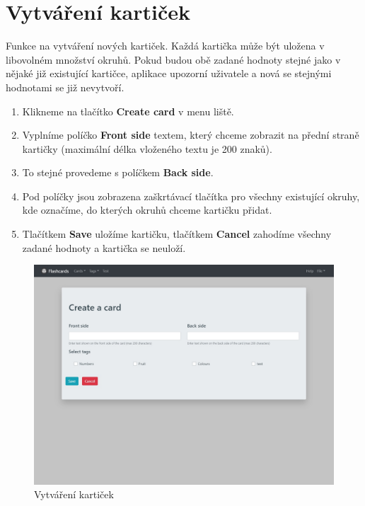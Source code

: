 \documentclass[11pt]{article}
\providecommand{\tightlist}{\setlength{\itemsep}{1pt}\setlength{\parskip}{1pt}}
\begin{document}
\hypertarget{vytvuxe1ux159enuxed-kartiux10dek}{%
\section{Vytváření kartiček}\label{vytvuxe1ux159enuxed-kartiux10dek}}

Funkce na vytváření nových kartiček. Každá kartička může být uložena v
libovolném množství okruhů. Pokud budou obě zadané hodnoty stejné jako v
nějaké již existující kartičce, aplikace upozorní uživatele a nová se
stejnými hodnotami se již nevytvoří.

\begin{enumerate}
\def\labelenumi{\arabic{enumi}.}
\tightlist
\item
  Klikneme na tlačítko \textbf{Create card} v menu liště.
\item
  Vyplníme políčko \textbf{Front side} textem, který chceme zobrazit na
  přední straně kartičky (maximální délka vloženého textu je 200 znaků).
\item
  To stejné provedeme s políčkem \textbf{Back side}.
\item
  Pod políčky jsou zobrazena zaškrtávací tlačítka pro všechny existující
  okruhy, kde označíme, do kterých okruhů chceme kartičku přidat.
\item
  Tlačítkem \textbf{Save} uložíme kartičku, tlačítkem \textbf{Cancel}
  zahodíme všechny zadané hodnoty a kartička se neuloží.
\end{enumerate}

\begin{figure}
\centering
\includegraphics{../../../../assets/create_card.jpg}
\caption{Vytváření kartiček}
\end{figure}
\end{document}
